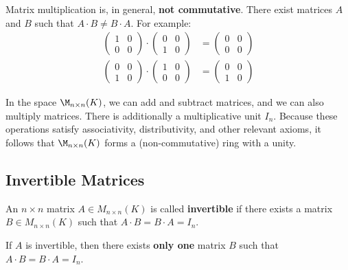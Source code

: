 \begin{importantremark}
Matrix multiplication is, in general, \textbf{not commutative}. There exist matrices $A$ and $B$ such that $A \cdot B \neq B \cdot A$. For example:
\begin{align*}
    \begin{pmatrix} 1 & 0 \\ 0 & 0 \end{pmatrix} \cdot \begin{pmatrix} 0 & 0 \\ 1 & 0 \end{pmatrix} &= \begin{pmatrix} 0 & 0 \\ 0 & 0 \end{pmatrix} \\
    \begin{pmatrix} 0 & 0 \\ 1 & 0 \end{pmatrix} \cdot \begin{pmatrix} 1 & 0 \\ 0 & 0 \end{pmatrix} &= \begin{pmatrix} 0 & 0 \\ 1 & 0 \end{pmatrix}
\end{align*}
\end{importantremark}

\begin{remark}
In the space $\M_{n \times n}(K)$, we can add and subtract matrices, and we can also multiply matrices. There is additionally a multiplicative unit $I_n$. Because these operations satisfy associativity, distributivity, and other relevant axioms, it follows that $\M_{n \times n}(K)$ forms a (non-commutative) ring with a unity.
\end{remark}

\subsection{Invertible Matrices}

\begin{definition}[Invertibility]
An $n \times n$ matrix $A \in M_{n \times n}(K)$ is called \textbf{invertible} if there exists a matrix $B \in M_{n \times n}(K)$ such that $A \cdot B = B \cdot A = I_n$.
\end{definition}

\begin{remark}
If $A$ is invertible, then there exists \textbf{only one} matrix $B$ such that $A \cdot B = B \cdot A = I_n$.
\end{remark}

